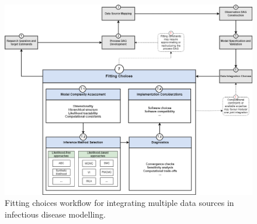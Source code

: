 \documentclass{article}
\begin{document}
\begin{figure}[htbp]
    \centering
    \includegraphics[width=\textwidth]{figures/Subpanel_fitting choices_v2.drawio.png}
    \caption{Fitting choices workflow for integrating multiple data sources in infectious disease modelling.}
    \label{fig:fitting}
\end{figure}



\end{document}
